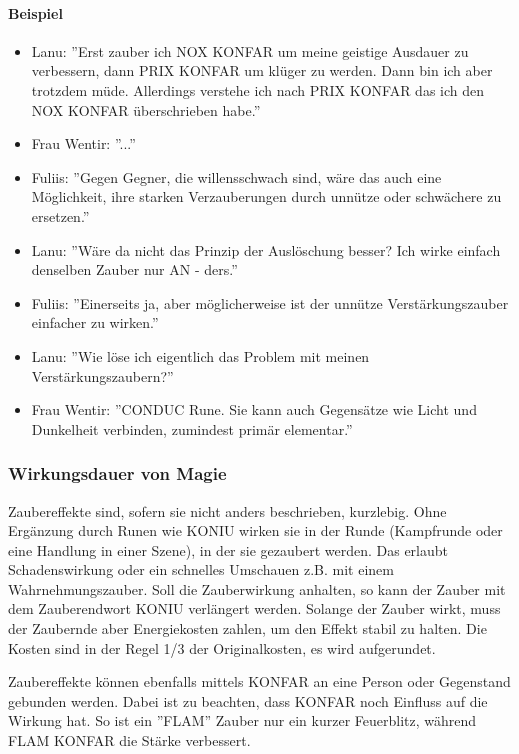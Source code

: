 \documentclass{article}
\begin{document}
\paragraph{Beispiel}

\begin{itemize}
\item Lanu: ''Erst zauber ich NOX KONFAR um meine geistige Ausdauer zu verbessern, dann PRIX KONFAR um klüger zu werden. Dann bin ich aber trotzdem müde. Allerdings verstehe ich nach PRIX KONFAR das ich den NOX KONFAR überschrieben habe.''
\item Frau Wentir: ''...''
\item Fuliis: ''Gegen Gegner, die willensschwach sind, wäre das auch eine Möglichkeit, ihre starken Verzauberungen durch unnütze oder schwächere zu ersetzen.''
\item Lanu: ''Wäre da nicht das Prinzip der Auslöschung besser? Ich wirke einfach denselben Zauber nur AN - ders.''
\item Fuliis: ''Einerseits ja, aber möglicherweise ist der unnütze Verstärkungszauber einfacher zu wirken.''
\item Lanu: ''Wie löse ich eigentlich das Problem mit meinen Verstärkungszaubern?''
\item Frau Wentir: ''CONDUC Rune. Sie kann auch Gegensätze wie Licht und Dunkelheit verbinden, zumindest primär elementar.''
\end{itemize}

\subsubsection{Wirkungsdauer von Magie}

Zaubereffekte sind, sofern sie nicht anders beschrieben, kurzlebig. Ohne Ergänzung durch Runen wie KONIU wirken sie in
der Runde (Kampfrunde oder eine Handlung in einer Szene), in der sie gezaubert werden. Das erlaubt Schadenswirkung oder
ein schnelles Umschauen z.B. mit einem Wahrnehmungszauber. Soll die Zauberwirkung anhalten, so kann der Zauber
mit dem Zauberendwort KONIU verlängert werden. Solange der Zauber wirkt, muss der Zaubernde aber Energiekosten zahlen,
um den Effekt stabil zu halten. Die Kosten sind in der Regel 1/3 der Originalkosten, es wird aufgerundet.

Zaubereffekte können ebenfalls mittels KONFAR an eine Person oder Gegenstand gebunden werden. Dabei ist zu beachten,
dass KONFAR noch Einfluss auf die Wirkung hat. So ist ein ''FLAM'' Zauber nur ein kurzer Feuerblitz, während FLAM KONFAR
die Stärke verbessert.
\end{document}
